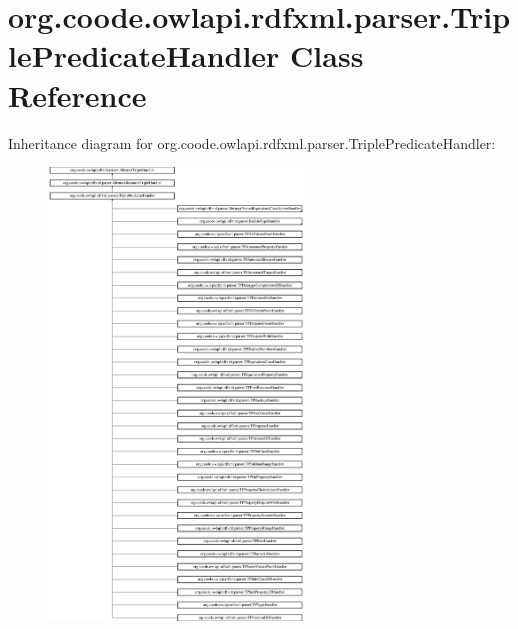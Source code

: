 \hypertarget{classorg_1_1coode_1_1owlapi_1_1rdfxml_1_1parser_1_1_triple_predicate_handler}{\section{org.\-coode.\-owlapi.\-rdfxml.\-parser.\-Triple\-Predicate\-Handler Class Reference}
\label{classorg_1_1coode_1_1owlapi_1_1rdfxml_1_1parser_1_1_triple_predicate_handler}
}
Inheritance diagram for org.\-coode.\-owlapi.\-rdfxml.\-parser.\-Triple\-Predicate\-Handler\-:\begin{figure}[H]
\begin{center}
\leavevmode
\includegraphics[height=12.000000cm]{classorg_1_1coode_1_1owlapi_1_1rdfxml_1_1parser_1_1_triple_predicate_handler}
\end{center}
\end{figure}
